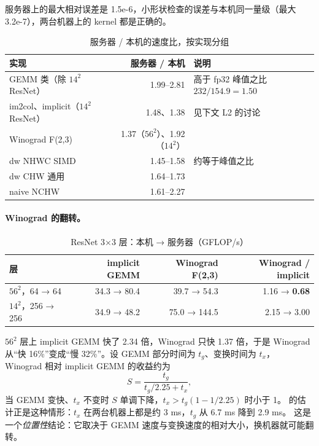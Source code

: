 \documentclass[11pt,a4paper]{ctexart}
\begin{document}
服务器上的最大相对误差是 1.5e-6，小形状检查的误差与本机同一量级（最大 3.2e-7），两台机器上的 kernel 都是正确的。

\begin{table}[H]
\centering\small
\caption{服务器 / 本机的速度比，按实现分组}\label{tab:ratio}
\begin{tabular}{lrl}
\toprule
实现 & 服务器 / 本机 & 说明 \\
\midrule
GEMM 类（除 $14^2$ ResNet） & 1.99--2.81 & 高于 fp32 峰值之比 $232/154.9 = 1.50$ \\
im2col、implicit（$14^2$ ResNet） & 1.48、1.38 & 见下文 L2 的讨论 \\
Winograd F(2,3) & 1.37（$56^2$）、1.92（$14^2$） & \\
dw NHWC SIMD & 1.45--1.58 & 约等于峰值之比 \\
dw CHW 通用 & 1.64--1.73 & \\
naive NCHW & 1.61--2.27 & \\
\bottomrule
\end{tabular}
\end{table}

\paragraph{Winograd 的翻转。}

\begin{table}[H]
\centering\small
\caption{ResNet 3×3 层：本机 → 服务器（GFLOP/s）}\label{tab:flip}
\begin{tabular}{lrrr}
\toprule
层 & implicit GEMM & Winograd F(2,3) & Winograd / implicit \\
\midrule
$56^2$，64 → 64 & 34.3 → 80.4 & 39.7 → 54.3 & 1.16 → \textbf{0.68} \\
$14^2$，256 → 256 & 34.9 → 48.2 & 75.0 → 144.5 & 2.15 → 3.00 \\
\bottomrule
\end{tabular}
\end{table}

$56^2$ 层上 implicit GEMM 快了 2.34 倍，Winograd 只快 1.37 倍，于是 Winograd 从“快 16\%”变成“慢 32\%”。设 GEMM 部分时间为 $t_g$、变换时间为 $t_x$，
Winograd 相对 implicit GEMM 的收益约为
\begin{equation}
  S = \frac{t_g}{t_g/2.25 + t_x},\label{eq:flip}
\end{equation}
当 GEMM 变快、$t_x$ 不变时 $S$ 单调下降，$t_x > t_g(1-1/2.25)$ 时小于 1。 的估计正是这种情形：$t_x$ 在两台机器上都是约 3 ms，$t_g$ 从 6.7 ms 降到 2.9 ms。
这是一个\emph{位置性}结论：它取决于 GEMM 速度与变换速度的相对大小，换机器就可能翻转。
\end{document}
